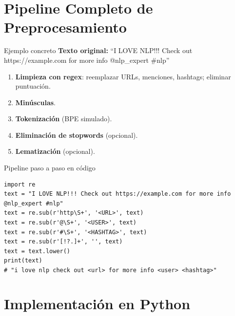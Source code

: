 \documentclass[aspectratio=169, 10pt, xcolor=table]{beamer}
\begin{document}
\section{Pipeline Completo de Preprocesamiento}

\begin{frame}{Ejemplo concreto}
    \textbf{Texto original:} ``I LOVE NLP!!! Check out https://example.com for more info @nlp\_expert \#nlp''
    \begin{enumerate}
        \item \textbf{Limpieza con regex}: reemplazar URLs, menciones, hashtags; eliminar puntuación.
        \item \textbf{Minúsculas}.
        \item \textbf{Tokenización} (BPE simulado).
        \item \textbf{Eliminación de stopwords} (opcional).
        \item \textbf{Lematización} (opcional).
    \end{enumerate}
\end{frame}

\begin{frame}[fragile]{Pipeline paso a paso en código}
    \begin{lstlisting}
import re
text = "I LOVE NLP!!! Check out https://example.com for more info @nlp_expert #nlp"
text = re.sub(r'http\S+', '<URL>', text)
text = re.sub(r'@\S+', '<USER>', text)
text = re.sub(r'#\S+', '<HASHTAG>', text)
text = re.sub(r'[!?.]+', '', text)
text = text.lower()
print(text)
# "i love nlp check out <url> for more info <user> <hashtag>"
    \end{lstlisting}
\end{frame}

\section{Implementación en Python}
\end{document}
